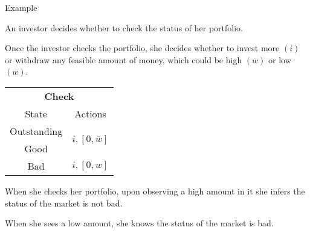 \documentclass[usenames,dvipsnames,aspectratio=169,11pt, envcountsect]{beamer}
\begin{document}
\begin{frame}{Example}

	An investor decides whether to check the status of her portfolio.

	\vfill

	Once the investor checks the portfolio, she decides whether to invest more \( \left( i \right) \) or withdraw any feasible amount of money, which could be high \( \left( \overline{w} \right) \) or low \( \left( w \right) \).

	\vfill

	\begin{table}[H]
		\centering
		\begin{minipage}{0.29\textwidth}

		\end{minipage}\hspace{0.3cm} %
		\begin{minipage}{0.29\textwidth}
			\centering
			\begin{tabular}{c | c}
				\multicolumn{2}{c}{\textbf{Check}}                                                                                 \\
				State                             & Actions                                                                        \\
				\hline
				{\color{bleudefrance}Outstanding} & \multirow{2}{*}{{\color{bleudefrance}\( i, \left[ 0, \overline{w} \right] \)}} \\
				{\color{bleudefrance}Good}        &                                                                                \\
				Bad                               & \(  i, \left[0, w \right] \)                                                   \\
			\end{tabular}
			\vspace{0.5cm} %
		\end{minipage}\hspace{0.3cm} %
		\begin{minipage}{0.29\textwidth}

		\end{minipage}
	\end{table} \pause

	\vfill

	When she checks her portfolio, upon observing a high amount in it she infers the status of the market is not bad.

	\vfill

	When she sees a low amount, she knows the status of the market is bad.

\end{frame}
\end{document}
